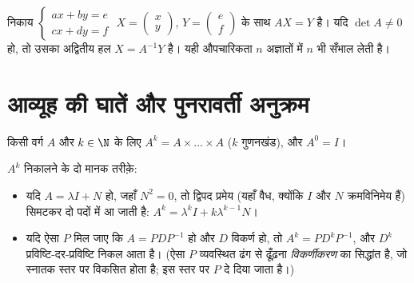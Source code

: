 \begin{method}[रैखिक निकाय]\label{met:g12:matrix:systems}
निकाय
$\begin{cases} ax + by = e\\ cx + dy = f \end{cases}$
$X = \begin{pmatrix} x \\ y\end{pmatrix}$, $Y = \begin{pmatrix} e \\ f\end{pmatrix}$ के साथ   $AX = Y$ है। यदि $\det A \neq 0$ हो, तो उसका अद्वितीय हल
$X = A^{-1}Y$ है। यही औपचारिकता $n$ अज्ञातों में $n$  भी सँभाल लेती है।
\end{method}

\section{आव्यूह की घातें और पुनरावर्ती अनुक्रम}

\begin{definition}\label{def:g12:matrix:power}
किसी वर्ग  $A$ और $k \in \N$ के लिए $A^k = A \times \dots \times A$ ($k$ गुणनखंड), और $A^0 = I$।
\end{definition}

\begin{method}[विकर्ण-जमा-शून्यघाती और विकर्णीयकरणीय स्थितियाँ]\label{met:g12:matrix:powers}
$A^k$ निकालने के दो मानक तरीक़े:
\begin{itemize}
  \item यदि $A = \lambda I + N$ हो, जहाँ $N^2 = 0$, तो द्विपद प्रमेय (यहाँ वैध, क्योंकि $I$ और
        $N$ क्रमविनिमेय हैं) सिमटकर दो पदों में आ जाती है: $A^k = \lambda^k I + k \lambda^{k-1} N$।
  \item यदि ऐसा  $P$ मिल जाए कि $A = PDP^{-1}$ हो और $D$ विकर्ण हो, तो
        $A^k = P D^k P^{-1}$, और $D^k$ प्रविष्टि-दर-प्रविष्टि निकल आता है। (ऐसा $P$
        व्यवस्थित ढंग से ढूँढ़ना \emph{विकर्णीकरण} का सिद्धांत है, जो स्नातक
        स्तर पर विकसित होता है; इस स्तर पर $P$ दे दिया जाता है।)
\end{itemize}
\end{method}

